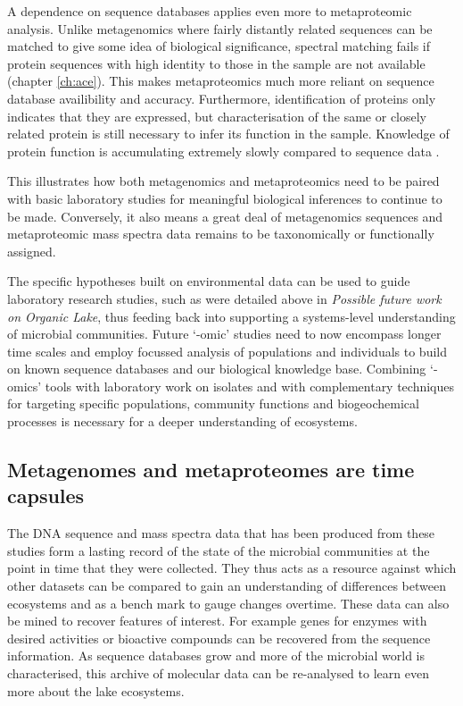 A dependence on sequence databases applies even more to metaproteomic analysis.
Unlike metagenomics where fairly distantly related sequences can be matched to give some idea of biological significance, spectral matching fails if protein sequences with high identity to those in the sample are not available (chapter \ref{ch:ace}).
This makes metaproteomics much more reliant on sequence database availibility and accuracy.
Furthermore, identification of proteins only indicates that they are expressed, but characterisation of the same or closely related protein is still necessary to infer its function in the sample.
Knowledge of protein function is accumulating extremely slowly compared to sequence data .

This illustrates how both metagenomics and metaproteomics need to be paired with basic laboratory studies for meaningful biological inferences to continue to be made.
Conversely, it also means a great deal of metagenomics sequences and metaproteomic mass spectra data remains to be taxonomically or functionally assigned.

The specific hypotheses built on environmental data can be used to guide laboratory research studies, such as were detailed above in \emph{Possible future work on Organic Lake}, thus feeding back into supporting a systems-level understanding of microbial communities.
Future `-omic' studies need to now encompass longer time scales and employ focussed analysis of populations and individuals to build on known sequence databases and our biological knowledge base.
Combining `-omics' tools with laboratory work on isolates and with complementary techniques for targeting specific populations, community functions and biogeochemical processes is necessary for a deeper understanding of ecosystems.

\subsection{Metagenomes and metaproteomes are time capsules}
The \textsc{DNA} sequence and mass spectra data that has been produced from these studies form a lasting record of the state of the microbial communities at the point in time that they were collected.
They thus acts as a resource against which other datasets can be compared to gain an understanding of differences between ecosystems and as a bench mark to gauge changes overtime.
These data can also be mined to recover features of interest.
For example genes for enzymes with desired activities or bioactive compounds can be recovered from the sequence information.
As sequence databases grow and more of the microbial world is characterised, this archive of molecular data can be re-analysed to learn even more about the lake ecosystems.

